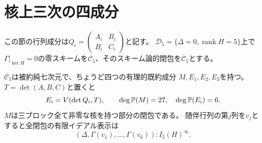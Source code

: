 \section{核上三次の四成分}
この節の行列成分は$Q_i=\left(\begin{smallmatrix}A_i&B_i\\B_i&C_i\end{smallmatrix}\right)$と記す。
$\mathcal D_5=\{\Delta=0,\operatorname{rank}H=5\}$上で
$\Gamma|_{\ker H}=0$の零スキームを$\mathcal C_5$、そのスキーム論的閉包を$\overline{\mathcal C}_5$とする。
\begin{theorem}\label{mh:four}
$\overline{\mathcal C}_5$は被約純七次元で、ちょうど四つの有理的既約成分
$M,E_1,E_2,E_3$を持つ。$T=\det(A,B,C)$と置くと
\[
 E_i=V(\det Q_i,T),\qquad
 \deg\mathbb P(M)=27,\quad\deg\mathbb P(E_i)=6.
\]
$M$は三ブロック全て非零な核を持つ部分の閉包である。
随伴行列の第$j$列を$v_j$とすると全閉包の有限イデアル表示は
\[
 (\Delta,\Gamma(v_1),\ldots,\Gamma(v_6)):I_5(H)^\infty.
\]
\end{theorem}
